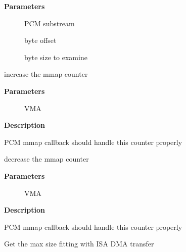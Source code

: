 \documentclass[a4paper,8pt,english]{sphinxmanual}
\begin{document}
\textbf{Parameters}
\begin{description}
\item[{}] \leavevmode
PCM substream

\item[{}] \leavevmode
byte offset

\item[{}] \leavevmode
byte size to examine

\end{description}

\begin{fulllineitems}
\label{sound/kernel-api/alsa-driver-api:c.snd_pcm_mmap_data_open}
increase the mmap counter

\end{fulllineitems}


\textbf{Parameters}
\begin{description}
\item[{}] \leavevmode
VMA

\end{description}

\textbf{Description}

PCM mmap callback should handle this counter properly

\begin{fulllineitems}
\label{sound/kernel-api/alsa-driver-api:c.snd_pcm_mmap_data_close}
decrease the mmap counter

\end{fulllineitems}


\textbf{Parameters}
\begin{description}
\item[{}] \leavevmode
VMA

\end{description}

\textbf{Description}

PCM mmap callback should handle this counter properly

\begin{fulllineitems}
\label{sound/kernel-api/alsa-driver-api:c.snd_pcm_limit_isa_dma_size}
Get the max size fitting with ISA DMA transfer

\end{fulllineitems}
\end{document}

